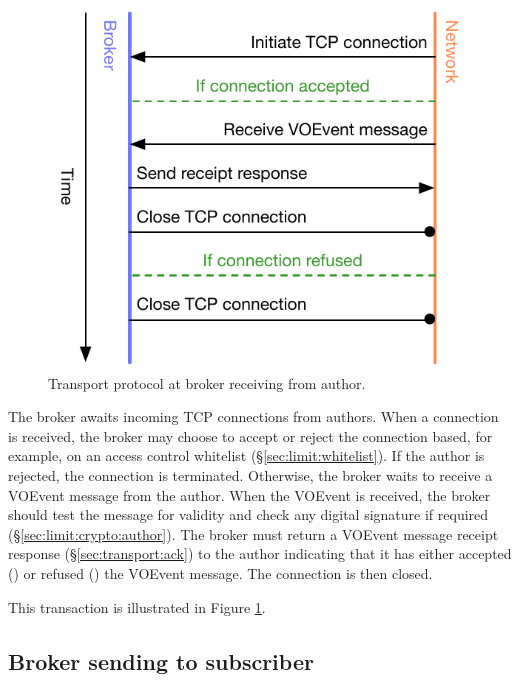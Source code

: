 \documentclass[a4paper,11pt]{ivoa}
\begin{document}
\begin{figure}
  \begin{center}
  \includegraphics{figures/brokerfromauthor.pdf}
  \end{center}

  \caption{Transport protocol at broker receiving from author.}

  \label{fig:protocol:brokerfromauthor}
\end{figure}

The broker awaits incoming TCP connections from authors. When a connection is
received, the broker may choose to accept or reject the connection based, for
example, on an access control whitelist (\S\ref{sec:limit:whitelist}). If the
author is rejected, the connection is terminated. Otherwise, the broker
waits to receive a VOEvent message from the author. When the VOEvent is
received, the broker should test the message for validity and check any
digital signature if required (\S\ref{sec:limit:crypto:author}). The broker
must return a VOEvent message receipt response (\S\ref{sec:transport:ack}) to
the author indicating that it has either accepted () or refused
() the VOEvent message. The connection is then closed.

This transaction is illustrated in Figure \ref{fig:protocol:brokerfromauthor}.

\subsection{Broker sending to subscriber}
\label{sec:protocol:brokertosub}
\end{document}
